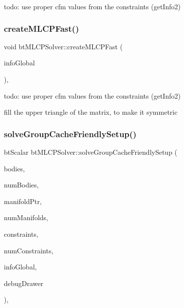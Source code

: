 todo\+: use proper cfm values from the constraints (get\+Info2) \mbox{\label{classbtMLCPSolver_ab36b9b3bf2bbbd1de7db27ba109e0a8a}} 
\subsubsection{\texorpdfstring{create\+M\+L\+C\+P\+Fast()}{createMLCPFast()}}
{\footnotesize\ttfamily void bt\+M\+L\+C\+P\+Solver\+::create\+M\+L\+C\+P\+Fast (\begin{DoxyParamCaption}\item[{const \hyperlink{structbtContactSolverInfo}{bt\+Contact\+Solver\+Info} \&}]{info\+Global }\end{DoxyParamCaption})\hspace{0.3cm}{\ttfamily [protected]}, {\ttfamily [virtual]}}

todo\+: use proper cfm values from the constraints (get\+Info2)

fill the upper triangle of the matrix, to make it symmetric \mbox{\label{classbtMLCPSolver_aa465e167537eceb89f7125d3bb2d5321}} 
\subsubsection{\texorpdfstring{solve\+Group\+Cache\+Friendly\+Setup()}{solveGroupCacheFriendlySetup()}}
{\footnotesize\ttfamily bt\+Scalar bt\+M\+L\+C\+P\+Solver\+::solve\+Group\+Cache\+Friendly\+Setup (\begin{DoxyParamCaption}\item[{bt\+Collision\+Object $\ast$$\ast$}]{bodies,  }\item[{int}]{num\+Bodies,  }\item[{bt\+Persistent\+Manifold $\ast$$\ast$}]{manifold\+Ptr,  }\item[{int}]{num\+Manifolds,  }\item[{bt\+Typed\+Constraint $\ast$$\ast$}]{constraints,  }\item[{int}]{num\+Constraints,  }\item[{const \hyperlink{structbtContactSolverInfo}{bt\+Contact\+Solver\+Info} \&}]{info\+Global,  }\item[{\hyperlink{classbtIDebugDraw}{bt\+I\+Debug\+Draw} $\ast$}]{debug\+Drawer }\end{DoxyParamCaption})\hspace{0.3cm}{\ttfamily [protected]}, {\ttfamily [virtual]}}


